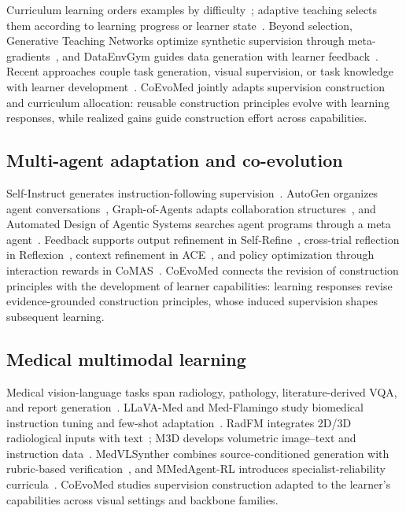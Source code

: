 Curriculum learning orders examples by difficulty~\citep{bengio2009curriculum}; adaptive teaching selects them according to learning progress or learner state~\citep{matiisen2017teacher,liu2017iterative}. Beyond selection, Generative Teaching Networks optimize synthetic supervision through meta-gradients~\citep{such2020generative}, and DataEnvGym guides data generation with learner feedback~\citep{khan2025dataenvgym}. Recent approaches couple task generation, visual supervision, or task knowledge with learner development~\citep{huang2026rzero,zhang2026viper,wu2026k2}. CoEvoMed jointly adapts supervision construction and curriculum allocation: reusable construction principles evolve with learning responses, while realized gains guide construction effort across capabilities.

\subsection{Multi-agent adaptation and co-evolution}

Self-Instruct generates instruction-following supervision~\citep{wang2023self}. AutoGen organizes agent conversations~\citep{wu2024autogen}, Graph-of-Agents adapts collaboration structures~\citep{yun2026graph}, and Automated Design of Agentic Systems searches agent programs through a meta agent~\citep{hu2025automated}. Feedback supports output refinement in Self-Refine~\citep{madaan2023selfrefine}, cross-trial reflection in Reflexion~\citep{shinn2023reflexion}, context refinement in ACE~\citep{zhang2026agentic}, and policy optimization through interaction rewards in CoMAS~\citep{xue2026comas}. CoEvoMed connects the revision of construction principles with the development of learner capabilities: learning responses revise evidence-grounded construction principles, whose induced supervision shapes subsequent learning.

\subsection{Medical multimodal learning}

Medical vision-language tasks span radiology, pathology, literature-derived VQA, and report generation~\citep{lau2018dataset,liu2021slake,he2020pathvqa,zhang2024pmc,johnson2019mimic,demnerfushman2016preparing}. LLaVA-Med and Med-Flamingo study biomedical instruction tuning and few-shot adaptation~\citep{li2023llava,moor2023med}. RadFM integrates 2D/3D radiological inputs with text~\citep{wu2025radfm}; M3D develops volumetric image--text and instruction data~\citep{bai2024m3d}. MedVLSynther combines source-conditioned generation with rubric-based verification~\citep{huang2026synthesizing}, and MMedAgent-RL introduces specialist-reliability curricula~\citep{xia2026mmedagent}. CoEvoMed studies supervision construction adapted to the learner's capabilities across visual settings and backbone families.
